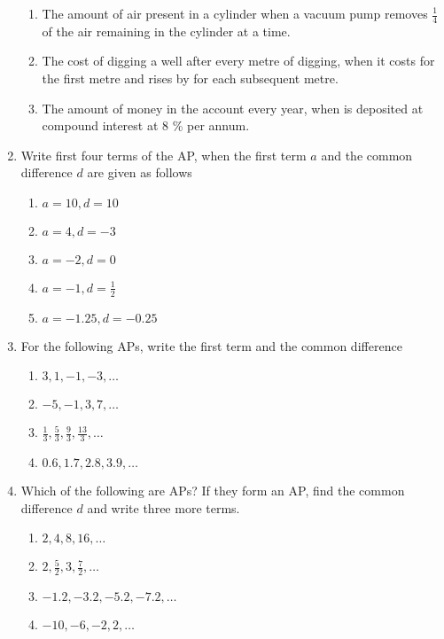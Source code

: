 \begin{enumerate}[label=\thesubsection.\arabic*, ref=\thesubsection.\theenumi]
\begin{enumerate}
\item The amount of air present in a cylinder when a vacuum pump removes 
$\frac{1}{4}$ of the air remaining in the cylinder at a time.
\item  The cost of digging a well after every metre of digging,  when it costs  for the first metre and rises by  for each subsequent metre.
\item The amount of money in the account every year,  when  is deposited at compound interest at 8 \% per annum.
\end{enumerate}
\item Write first four terms of the AP,  when the first term $a$ and the common difference $d$ are
given as follows
		\begin{multicols}{2}
\begin{enumerate}
\item $a = 10,  d = 10	$	
\item $a = 4,  d = -3	$	
\item $a = -2,  d = 0	$	
\item $ a = -1,  d =\frac{1}{2}$
\item $a = -1.25,  d = -0.25$	
\end{enumerate}
\end{multicols}
\item For the following APs,  write the first term and the common difference
	\begin{multicols}{2}
		\begin{enumerate}[itemsep=1ex]
\item $3,  1,  -1,  -3,  \dots $
\item $-5,  -1,  3,  7,  \dots $
\item $\frac{1}{3},  \frac{5}{3},  \frac{9}{3},  \frac{13}{3}, \dots $
\item $0.6,  1.7,  2.8,  3.9, \dots $ 
\end{enumerate}
\end{multicols}
\item Which of the following are APs? If they form an AP,  find the common difference $d$ and
write three more terms.
\begin{multicols}{2}
\begin{enumerate}[itemsep=1ex]
\item $2,  4,  8,  16,  \dots $
\item $2, \frac{5}{2},  3,  \frac{7}{2}, \dots $
\item $-1.2,  -3.2,  -5.2,  -7.2,  \dots $
\item $-10,  -6,  -2,  2,  \dots $

\end{enumerate}
\end{multicols}
\end{enumerate}
